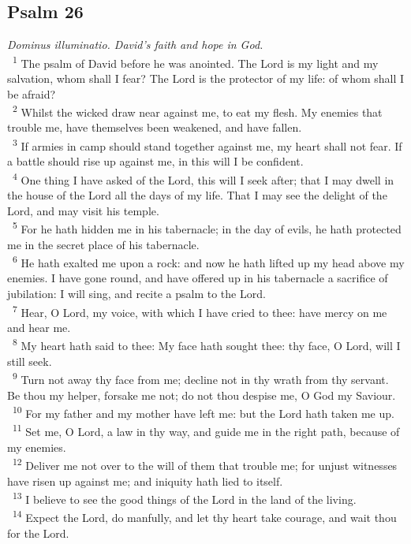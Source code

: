 \documentclass[a5paper,12pt]{article}
\begin{document}
\begin{multicols*}{2}
\section{Psalm 26}
\label{sec:orgba0183d}
\emph{Dominus illuminatio. David's faith and hope in God.}\\

~\textsuperscript{1} The psalm of David before he was anointed. The Lord is my light and my salvation, whom shall I fear? The Lord is the protector of my life: of whom shall I be afraid?\\
~\textsuperscript{2} Whilst the wicked draw near against me, to eat my flesh. My enemies that trouble me, have themselves been weakened, and have fallen.\\
~\textsuperscript{3} If armies in camp should stand together against me, my heart shall not fear. If a battle should rise up against me, in this will I be confident.\\
~\textsuperscript{4} One thing I have asked of the Lord, this will I seek after; that I may dwell in the house of the Lord all the days of my life. That I may see the delight of the Lord, and may visit his temple.\\
~\textsuperscript{5} For he hath hidden me in his tabernacle; in the day of evils, he hath protected me in the secret place of his tabernacle.\\
~\textsuperscript{6} He hath exalted me upon a rock: and now he hath lifted up my head above my enemies. I have gone round, and have offered up in his tabernacle a sacrifice of jubilation: I will sing, and recite a psalm to the Lord.\\
~\textsuperscript{7} Hear, O Lord, my voice, with which I have cried to thee: have mercy on me and hear me.\\
~\textsuperscript{8} My heart hath said to thee: My face hath sought thee: thy face, O Lord, will I still seek.\\
~\textsuperscript{9} Turn not away thy face from me; decline not in thy wrath from thy servant. Be thou my helper, forsake me not; do not thou despise me, O God my Saviour.\\
~\textsuperscript{10} For my father and my mother have left me: but the Lord hath taken me up.\\
~\textsuperscript{11} Set me, O Lord, a law in thy way, and guide me in the right path, because of my enemies.\\
~\textsuperscript{12} Deliver me not over to the will of them that trouble me; for unjust witnesses have risen up against me; and iniquity hath lied to itself.\\
~\textsuperscript{13} I believe to see the good things of the Lord in the land of the living.\\
~\textsuperscript{14} Expect the Lord, do manfully, and let thy heart take courage, and wait thou for the Lord.\\


\end{multicols*}
\end{document}
